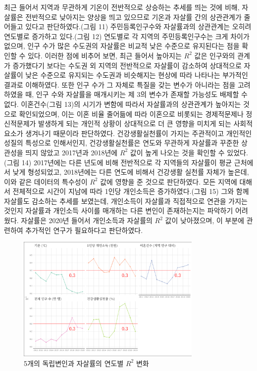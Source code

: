 \documentclass[a4paper, 11pt]{oblivoir}
\begin{document}
    최근 들어서 지역과 무관하게 기온이 전반적으로 상승하는 추세를 띄는 것에 비해,
    자살률은 전반적으로 낮아지는 양상을 띄고 있으므로 기온과 자살률 간의 상관관계가 줄어들고 있다고 판단하였다.(그림 11) 주민등록인구수와 자살률과의
    상관관계는 오히려 연도별로 증가하고 있다.(그림 12) 연도별로 각 지역의 주민등록인구수는 크게 차이가 없으며, 인구 수가 많은 수도권의 자살률은 비교적 낮은
    수준으로 유지된다는 점을 확인할 수 있다. 이러한 점에 비추어 보면, 최근 들어서 높아지는 $R^{2}$ 값은 인구와의 관계가 증가했다기
    보다는 수도권 외 지역의 전반적으로 자살률이 감소하여 상대적으로 자살률이 낮은 수준으로 유지되는 수도권과 비슷해지는 현상에 따라
    나타나는 부가적인 결과로 이해하였다. 또한 인구 수가 그 자체로 특질을 갖는 변수가 아니라는 점을 고려하였을 때, 인구 수와 자살률을 매개시키는 제 3의 변수가 존재할 가능성도 배제할 수 없다.
    이혼건수(그림 13)의 시기가 변함에 따라서 자살률과의 상관관계가 높아지는 것으로 확인되었으며,
    이는 이혼 비율 줄어듦에 따라 이혼으로 비롯되는 경제적문제나 정신적문제가 발생하게 되는 개인적 상황이 상대적으로 더 큰 영향을 미치게 되는 
    사회적 요소가 생겨나기 때문이라 판단하였다. 
    건강생활실천률이 가지는 주관적이고 개인적인 성질의 특성으로 인해서인지, 건강생활실천률은 연도와 무관하게 자살률과 꾸준한 상관성을 띄지 않았고
    2017년과 2018년에 $R^{2}$ 값이 높게 나오는 것을 확인할 수 있었다.(그림 14) 2017년에는 다른 년도에 비해 전반적으로 각 지역들의 자살률이 평균 근처에서 낮게 형성되었고, 
    2018년에는 다른 연도에 비해서 건강생활 실천률 자체가 높은데, 이와 같은 데이터의 특수성이 $R^{2}$ 값에 영향을 준 것으로 판단하였다. 
    모든 지역에 대해서 전체적으로 시간이 지남에 따라 1인당 개인소득은 증가하였다.(그림 15) 
    그와 함께 자살률도 감소하는 추세를 보였는데, 개인소득이 자살률과 직접적으로 연관을 가지는 것인지 자살률과 개인소득 사이를 매개하는
    다른 변인이 존재하는지는 파악하기 어려웠다. 자살률은 2020년 들어서 개인소득과 자살률의 $R^{2}$ 값이 낮아졌으며, 이 부분에 관련하여 추가적인 연구가 필요하다고
    판단하였다.
    \begin{figure}[!ht]
        \includegraphics[width = 0.8\textwidth]{picture6.png}
        \caption{5개의 독립변인과 자살률의 연도별 $R^{2}$ 변화}
        \label{fig:pic6}
      \end{figure}
    
\end{document}
